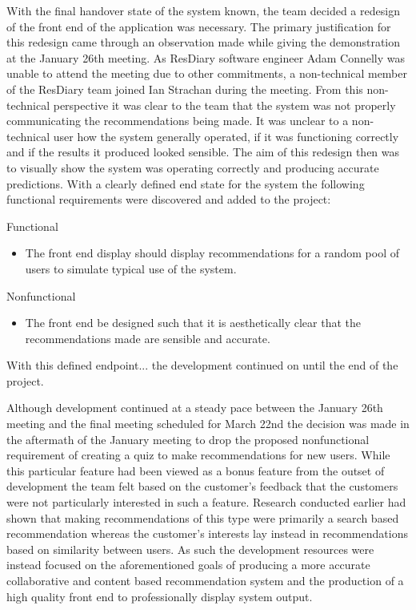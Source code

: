 \documentclass{l3proj}
\begin{document}
With the final handover state of the system known, the team decided a redesign of the front end of the application was necessary. The primary justification for this redesign came through an observation made while giving the demonstration at the January 26th meeting. As ResDiary software engineer Adam Connelly was unable to attend the meeting due to other commitments, a non-technical member of the ResDiary team joined Ian Strachan during the meeting. From this non-technical perspective it was clear to the team that the system was not properly communicating the recommendations being made. It was unclear to a non-technical user how the system generally operated, if it was functioning correctly and if the results it produced looked sensible. The aim of this redesign then was to visually show the system was operating correctly and producing accurate predictions. With a clearly defined end state for the system the following functional requirements were discovered and added to the project: 

Functional
\begin{itemize}
\item The front end display should display recommendations for a random pool of users to simulate typical use of the system.
\end{itemize}

Nonfunctional
\begin{itemize}
\item The front end be designed such that it is aesthetically clear that the recommendations made are sensible and accurate.
\end{itemize}

With this defined endpoint... the development continued on until the end of the project.

Although development continued at a steady pace between the January 26th meeting and the final meeting scheduled for March 22nd the decision was made in the aftermath of the January meeting to drop the proposed nonfunctional requirement of creating a quiz to make recommendations for new users. While this particular feature had been viewed as a bonus feature from the outset of development the team felt based on the customer’s feedback that the customers were not particularly interested in such a feature. Research conducted earlier had shown that making recommendations of this type were primarily a search based recommendation whereas the customer’s interests lay instead in recommendations based on similarity between users. As such the development resources were instead focused on the aforementioned goals of producing a more accurate collaborative and content based recommendation system and the production of a high quality front end to professionally display system output. 
\end{document}
